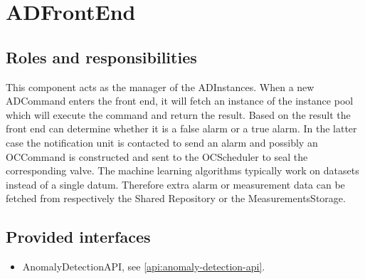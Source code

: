 \section{ADFrontEnd}
\label{element:ad-frontend}

\subsection{Roles and responsibilities}

\npar This component acts as the manager of the ADInstances. When a new
ADCommand enters the front end, it will fetch an instance of the instance pool
which will execute the command and return the result. Based on the result the front
end can determine whether it is a false alarm or a true alarm. In the latter
case the notification unit is contacted to send an alarm and possibly an
OCCommand is constructed and sent to the OCScheduler to seal the corresponding
valve. The machine learning algorithms typically work on datasets instead of a
single datum. Therefore extra alarm or measurement data can be fetched from
respectively the Shared Repository or the MeasurementsStorage.

\subsection{Provided interfaces}

\begin{itemize}
  \item AnomalyDetectionAPI, see \ref{api:anomaly-detection-api}.
\end{itemize}



